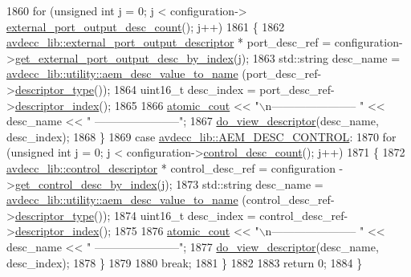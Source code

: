 \begin{DoxyCode}
1860         \textcolor{keywordflow}{for} (\textcolor{keywordtype}{unsigned} \textcolor{keywordtype}{int} j = 0; j < configuration->
      \hyperlink{classavdecc__lib_1_1configuration__descriptor_aca2a0ab2856be16f3e928c5441f69df8}{external\_port\_output\_desc\_count}(); j++)
1861         \{
1862             \hyperlink{classavdecc__lib_1_1external__port__output__descriptor}{avdecc\_lib::external\_port\_output\_descriptor} * 
      port\_desc\_ref = configuration->\hyperlink{classavdecc__lib_1_1configuration__descriptor_a58f09b090b126e803061158bf1e22c5e}{get\_external\_port\_output\_desc\_by\_index}(j);
1863             std::string desc\_name = \hyperlink{namespaceavdecc__lib_1_1utility_a6bdd02679e5a911a071d4aa03be341f0}{avdecc\_lib::utility::aem\_desc\_value\_to\_name}
      (port\_desc\_ref->\hyperlink{classavdecc__lib_1_1descriptor__base_a5112b70022171063ec5d3242bee9910e}{descriptor\_type}());
1864             uint16\_t desc\_index = port\_desc\_ref->\hyperlink{classavdecc__lib_1_1descriptor__base_a7eed5583bffdf72d89021b188648c1b5}{descriptor\_index}();
1865 
1866             \hyperlink{cmd__line_8h_a0bc38ccc65c79ba06c6fcd7b4bf554c3}{atomic\_cout} << \textcolor{stringliteral}{"\(\backslash\)n----------------------- "} << desc\_name << \textcolor{stringliteral}{"
       -----------------------"};
1867             \hyperlink{classcmd__line_aef7d9f8c4eff85c46e5b7aea0961bb51}{do\_view\_descriptor}(desc\_name, desc\_index);
1868         \}
1869     \textcolor{keywordflow}{case} \hyperlink{namespaceavdecc__lib_ac7b7d227e46bc72b63ee9e9aae15902fa200b40ee880b3e8c19f1a3f300ecb038}{avdecc\_lib::AEM\_DESC\_CONTROL}:
1870         \textcolor{keywordflow}{for} (\textcolor{keywordtype}{unsigned} \textcolor{keywordtype}{int} j = 0; j < configuration->\hyperlink{classavdecc__lib_1_1configuration__descriptor_adb8ec7a53baa84c4bcdca47cab26f177}{control\_desc\_count}(); j++)
1871         \{
1872             \hyperlink{classavdecc__lib_1_1control__descriptor}{avdecc\_lib::control\_descriptor} * control\_desc\_ref = configuration
      ->\hyperlink{classavdecc__lib_1_1configuration__descriptor_a970929f76405008ad7c5116ba3b71ca7}{get\_control\_desc\_by\_index}(j);
1873             std::string desc\_name = \hyperlink{namespaceavdecc__lib_1_1utility_a6bdd02679e5a911a071d4aa03be341f0}{avdecc\_lib::utility::aem\_desc\_value\_to\_name}
      (control\_desc\_ref->\hyperlink{classavdecc__lib_1_1descriptor__base_a5112b70022171063ec5d3242bee9910e}{descriptor\_type}());
1874             uint16\_t desc\_index = control\_desc\_ref->\hyperlink{classavdecc__lib_1_1descriptor__base_a7eed5583bffdf72d89021b188648c1b5}{descriptor\_index}();
1875 
1876             \hyperlink{cmd__line_8h_a0bc38ccc65c79ba06c6fcd7b4bf554c3}{atomic\_cout} << \textcolor{stringliteral}{"\(\backslash\)n----------------------- "} << desc\_name << \textcolor{stringliteral}{"
       -----------------------"};
1877             \hyperlink{classcmd__line_aef7d9f8c4eff85c46e5b7aea0961bb51}{do\_view\_descriptor}(desc\_name, desc\_index);
1878         \}
1879 
1880         \textcolor{keywordflow}{break};
1881     \}
1882 
1883     \textcolor{keywordflow}{return} 0;
1884 \}
\end{DoxyCode}


